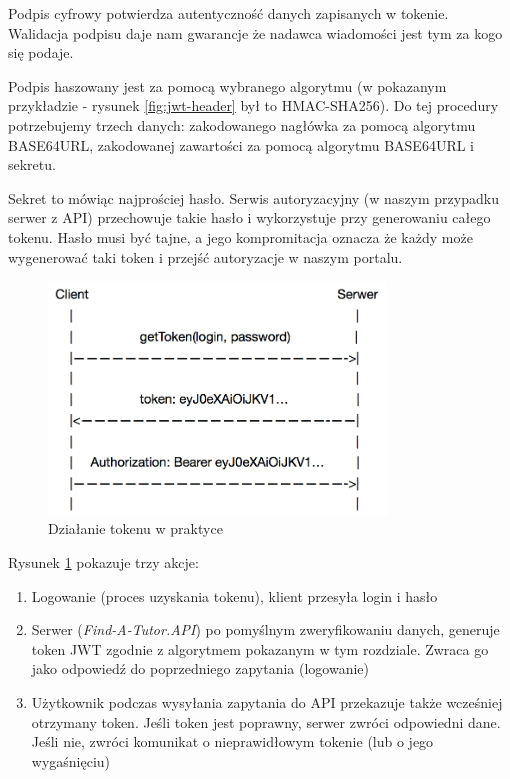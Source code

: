 \documentclass[12pt]{article}
\numberwithin{figure}{section}
\begin{document}
    Podpis cyfrowy potwierdza autentyczność danych zapisanych w tokenie. Walidacja podpisu daje nam gwarancje że nadawca wiadomości jest tym za kogo się podaje.
    
    Podpis haszowany jest za pomocą wybranego algorytmu (w pokazanym przykładzie - rysunek \ref{fig:jwt-header} był to HMAC-SHA256). Do tej procedury potrzebujemy trzech danych: zakodowanego nagłówka za pomocą algorytmu BASE64URL, zakodowanej zawartości za pomocą algorytmu BASE64URL i sekretu. 
    
    Sekret to mówiąc najprościej hasło. Serwis autoryzacyjny (w naszym przypadku serwer z API) przechowuje takie hasło i wykorzystuje przy generowaniu całego tokenu. Hasło musi być tajne, a jego kompromitacja oznacza że każdy może wygenerować taki token i przejść autoryzacje w naszym portalu.
    
    \begin{figure}[H] 
     	\centering
    	\includegraphics[width=0.8\textwidth]{images/chapter_3/token-diagram.png}
    	\caption{Działanie tokenu w praktyce \cite{token-diagram}}
    	\label{fig:token-diagram}
    \end{figure}
    
    Rysunek \ref{fig:token-diagram} pokazuje trzy akcje:
    \begin{enumerate}
        \item Logowanie (proces uzyskania tokenu), klient przesyła login i hasło
        \item Serwer (\textit{Find-A-Tutor.API}) po pomyślnym zweryfikowaniu danych, generuje token JWT zgodnie z algorytmem pokazanym w tym rozdziale. Zwraca go jako odpowiedź do poprzedniego zapytania (logowanie)
        \item Użytkownik podczas wysyłania zapytania do API przekazuje także wcześniej otrzymany token. Jeśli token jest poprawny, serwer zwróci odpowiedni dane. Jeśli nie, zwróci komunikat o nieprawidłowym tokenie (lub o jego wygaśnięciu)
    \end{enumerate}
    
\end{document}
